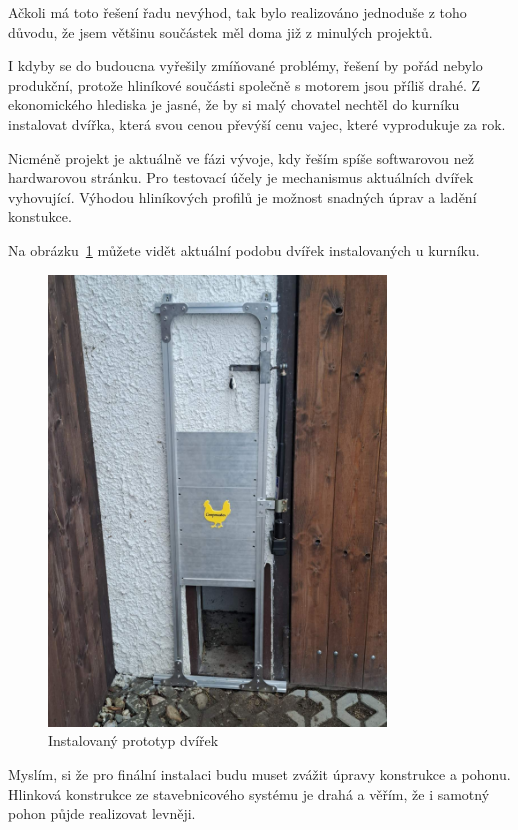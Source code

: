 Ačkoli má toto řešení řadu nevýhod, tak bylo realizováno jednoduše z toho důvodu, že jsem většinu součástek měl doma již z minulých projektů.

I kdyby se do budoucna vyřešily zmíňované problémy, řešení by pořád nebylo produkční, protože hliníkové součásti společně s motorem jsou příliš drahé.
Z ekonomického hlediska je jasné, že by si malý chovatel nechtěl do kurníku instalovat dvířka, která svou cenou převýší cenu vajec, které vyprodukuje za rok.

Nicméně projekt je aktuálně ve fázi vývoje, kdy řeším spíše softwarovou než hardwarovou stránku.
Pro testovací účely je mechanismus aktuálních dvířek vyhovující.
Výhodou hliníkových profilů je možnost snadných úprav a ladění konstukce.

Na obrázku~\ref{fig:proto_dvirka} můžete vidět aktuální podobu dvířek instalovaných u kurníku.

\begin{figure}[h]
    \centering
    \includegraphics[width=0.8\textwidth]{img/proto_dvirka}
    \caption{Instalovaný prototyp dvířek}
    \label{fig:proto_dvirka}
\end{figure}

Myslím, si že pro finální instalaci budu muset zvážit úpravy konstrukce a pohonu.
Hlinková konstrukce ze stavebnicového systému je drahá a věřím, že i samotný pohon půjde realizovat levněji.




